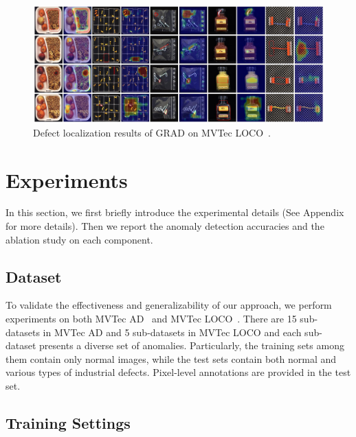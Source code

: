 \documentclass[letterpaper]{article} %
\begin{document}
\begin{figure}[!htbp]
\setlength{\belowcaptionskip}{0.0cm}
\setlength{\abovecaptionskip}{0.1cm}
    \centering
\includegraphics[width=0.9\linewidth]{images/loco_results.pdf}
    \caption{Defect localization results of GRAD on MVTec LOCO~\cite{MVloco}. } %
    \label{fig: main_results}
\end{figure}

\section{Experiments}

In this section, we first briefly introduce the experimental details (See Appendix for more details). Then we report the anomaly detection accuracies and the ablation study on each component. %

\subsection{Dataset}

To validate the effectiveness and generalizability of our approach, we perform experiments on both MVTec AD~\cite{MVTecAD} and MVTec LOCO~\cite{MVloco}. There are 15 sub-datasets in MVTec AD and 5 sub-datasets in MVTec LOCO and each sub-dataset presents a diverse set of anomalies.
Particularly, the training sets among them contain only normal images, while the test sets contain both normal and various types of industrial defects. Pixel-level annotations are provided in the test set.

\subsection{Training Settings}
\end{document}
